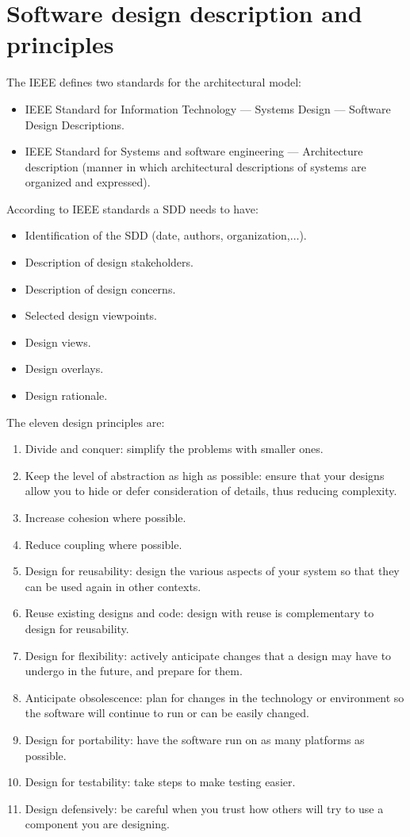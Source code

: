 \documentclass[12pt, a4paper]{report}
\theoremstyle{remark}
\begin{document}
\section{Software design description and principles}  
    The IEEE defines two standards for the architectural model: 
    \begin{itemize}
        \item IEEE Standard for Information Technology — Systems Design — Software Design Descriptions.
        \item IEEE Standard for Systems and software engineering — Architecture description (manner in which architectural descriptions of systems are organized and expressed).
    \end{itemize}
    According to IEEE standards a SDD needs to have: 
    \begin{itemize}
        \item Identification of the SDD (date, authors, organization,$\dots$).
        \item Description of design stakeholders.
        \item Description of design concerns.
        \item Selected design viewpoints.
        \item Design views.
        \item Design overlays.
        \item Design rationale.
    \end{itemize}
    The eleven design principles are: 
    \begin{enumerate}
        \item Divide and conquer: simplify the problems with smaller ones.
        \item Keep the level of abstraction as high as possible: ensure that your designs allow you to hide or defer consideration of details, thus reducing complexity.
        \item Increase cohesion where possible.
        \item Reduce coupling where possible.
        \item Design for reusability: design the various aspects of your system so that they can be used again in other contexts.
        \item Reuse existing designs and code: design with reuse is complementary to design for reusability.
        \item Design for flexibility: actively anticipate changes that a design may have to undergo in the future, and prepare for them. 
        \item Anticipate obsolescence: plan for changes in the technology or environment so the software will continue to run or can be easily changed. 
        \item Design for portability: have the software run on as many platforms as possible. 
        \item Design for testability: take steps to make testing easier.
        \item Design defensively: be careful when you trust how others will try to use a component you are designing.
    \end{enumerate}
\end{document}
